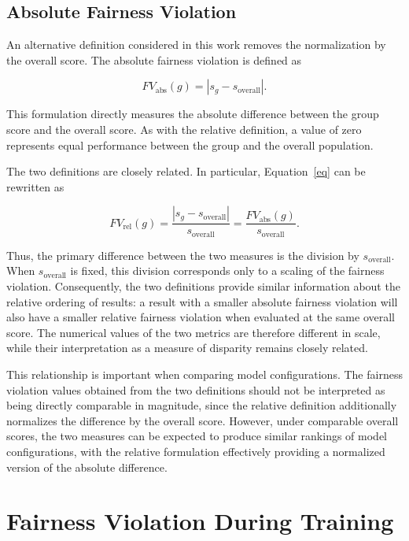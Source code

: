\subsection{Absolute Fairness Violation}

An alternative definition considered in this work removes the normalization by the overall score. The absolute fairness violation is defined as

\begin{equation}
FV_{\mathrm{abs}}(g)
=
\left|
s_g - s_{\mathrm{overall}}
\right|.
\label{eq}
\end{equation}

This formulation directly measures the absolute difference between the group score and the overall score. As with the relative definition, a value of zero represents equal performance between the group and the overall population.

The two definitions are closely related. In particular, Equation~\ref{eq} can be rewritten as

\begin{equation}
FV_{\mathrm{rel}}(g)
=
\frac{
\left|s_g - s_{\mathrm{overall}}\right|
}{
s_{\mathrm{overall}}
}
=
\frac{
FV_{\mathrm{abs}}(g)
}{
s_{\mathrm{overall}}
}.
\label{eq}
\end{equation}

Thus, the primary difference between the two measures is the division by $s_{\mathrm{overall}}$. When $s_{\mathrm{overall}}$ is fixed, this division corresponds only to a scaling of the fairness violation. Consequently, the two definitions provide similar information about the relative ordering of results: a result with a smaller absolute fairness violation will also have a smaller relative fairness violation when evaluated at the same overall score. The numerical values of the two metrics are therefore different in scale, while their interpretation as a measure of disparity remains closely related.

This relationship is important when comparing model configurations. The fairness violation values obtained from the two definitions should not be interpreted as being directly comparable in magnitude, since the relative definition additionally normalizes the difference by the overall score. However, under comparable overall scores, the two measures can be expected to produce similar rankings of model configurations, with the relative formulation effectively providing a normalized version of the absolute difference.

\section{Fairness Violation During Training}

